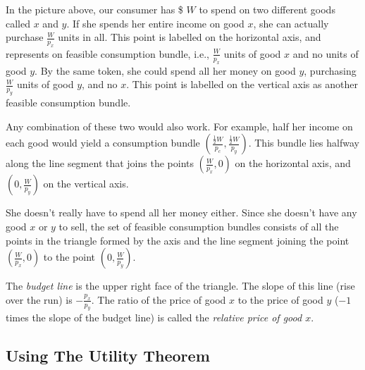 \documentclass[12pt]{article}
\newcommand{\tmem}[1]{\textit{#1}}
\begin{document}
In the picture above, our consumer has  \$ $W$ to spend on two different goods
called $x$ and $y$. If she spends her entire income on good $x$, she can
actually purchase $\frac{W}{p_x}$ units in all. This point is labelled on the
horizontal axis, and represents on feasible consumption bundle, i.e.,
$\frac{W}{p_x}$ units of good $x$ and no units of good $y$. By the same token,
she could spend all her money on good $y$, purchasing $\frac{W}{p_y}$ units of
good $y$, and no $x$. This point is labelled on the vertical axis as another
feasible consumption bundle.

Any combination of these two would also work. For example, half her income on
each good would yield a consumption bundle $( \frac{\frac{1}{2} W}{p_c},
\frac{\frac{1}{2} W}{p_y} )$. This bundle lies halfway along the line segment
that joins the points $( \frac{W}{p_x}, 0 )$ on the horizontal axis, and $( 0,
\frac{W}{p_y} )$ on the vertical axis.

She doesn't really have to spend all her money either. Since she doesn't have
any good $x$ or $y$ to sell, the set of feasible consumption bundles consists
of all the points in the triangle formed by the axis and the line segment
joining the point $( \frac{W}{p_x}, 0 )$ to the point $( 0, \frac{W}{p_y} )$.

The {\tmem{budget line}} is the upper right face of the triangle. The slope of
this line (rise over the run) is $- \frac{p_x}{p_y}$. The ratio of the price
of good $x$ to the price of good $y$ ($- 1$ times the slope of the budget
line) is called the {\tmem{relative price of good $x$}}.

\subsection{Using The Utility Theorem}
\end{document}
